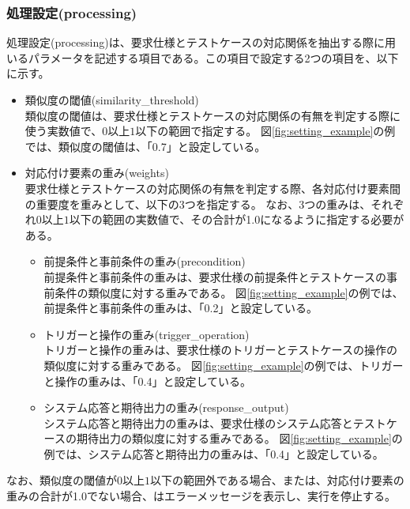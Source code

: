 \subsubsection{処理設定(processing)}\label{subsubsec:processing_setting}
処理設定(processing)は、要求仕様とテストケースの対応関係を抽出する際に用いるパラメータを記述する項目である。この項目で設定する2つの項目を、以下に示す。

\begin{itemize}
    \item 類似度の閾値(similarity\_threshold) \\
    類似度の閾値は、要求仕様とテストケースの対応関係の有無を判定する際に使う実数値で、$0$以上$1$以下の範囲で指定する。
    図\ref{fig:setting_example}の例では、類似度の閾値は、「0.7」と設定している。
    \item 対応付け要素の重み(weights) \\
    要求仕様とテストケースの対応関係の有無を判定する際、各対応付け要素間の重要度を重みとして、以下の3つを指定する。
    なお、3つの重みは、それぞれ$0$以上$1$以下の範囲の実数値で、その合計が1.0になるように指定する必要がある。
    \begin{itemize}
        \item 前提条件と事前条件の重み(precondition) \\
        前提条件と事前条件の重みは、要求仕様の前提条件とテストケースの事前条件の類似度に対する重みである。
        図\ref{fig:setting_example}の例では、前提条件と事前条件の重みは、「0.2」と設定している。
        \item トリガーと操作の重み(trigger\_operation) \\
        トリガーと操作の重みは、要求仕様のトリガーとテストケースの操作の類似度に対する重みである。
        図\ref{fig:setting_example}の例では、トリガーと操作の重みは、「0.4」と設定している。
        \item システム応答と期待出力の重み(response\_output) \\
        システム応答と期待出力の重みは、要求仕様のシステム応答とテストケースの期待出力の類似度に対する重みである。
        図\ref{fig:setting_example}の例では、システム応答と期待出力の重みは、「0.4」と設定している。
    \end{itemize}
\end{itemize}

なお、類似度の閾値が$0$以上$1$以下の範囲外である場合、または、対応付け要素の重みの合計が1.0でない場合、\tool はエラーメッセージを表示し、実行を停止する。


